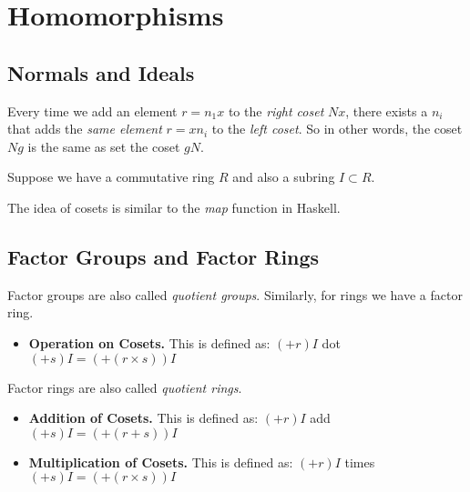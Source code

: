 
\chapter{Homomorphisms}




\section{Normals and Ideals}






Every time we add an element $r = n_1x$ to the \textit{right coset} $Nx$, 
there exists a $n_i$ that adds the \textit{same element} $r = xn_i$ to 
the \textit{left coset}. So in other words, the coset $Ng$ is the same as set the coset $gN$. 


Suppose we have a commutative ring $R$ and also a subring $I \subset R$.




The idea of cosets is similar to the \textit{map} function in Haskell. 


\section{Factor Groups and Factor Rings}



Factor groups are also called \textit{quotient groups}. Similarly, for rings we have a factor ring. 

\begin{itemize}	
\renewcommand{\labelitemi}{$\Box$}
\item \textbf{Operation on Cosets.}  This is defined as: $(+r)I$ dot $(+s)I = (+(r\times s))I$
\end{itemize}


Factor rings are also called \textit{quotient rings}. 

\begin{itemize}	
\renewcommand{\labelitemi}{$\Box$}
\item \textbf{Addition of Cosets.} This is defined as: $(+r)I$ add $(+s)I = (+(r+s))I$
\item \textbf{Multiplication of Cosets.}  This is defined as: $(+r)I$ times $(+s)I = (+(r\times s))I$
\end{itemize}



